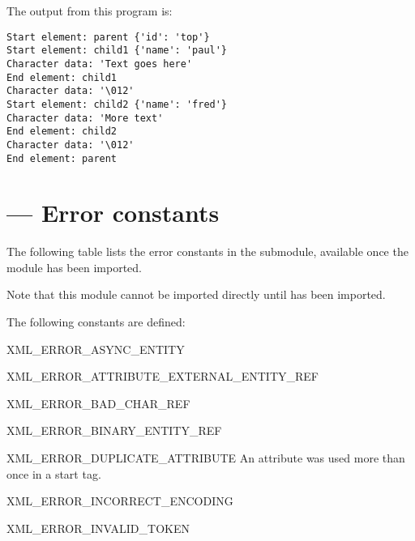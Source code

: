 The output from this program is:

\begin{verbatim}
Start element: parent {'id': 'top'}
Start element: child1 {'name': 'paul'}
Character data: 'Text goes here'
End element: child1
Character data: '\012'
Start element: child2 {'name': 'fred'}
Character data: 'More text'
End element: child2
Character data: '\012'
End element: parent
\end{verbatim}


\section{ --- Error constants}


The following table lists the error constants in the
 submodule, available once the
 module has been imported.

Note that this module cannot be imported directly until
 has been imported.

The following constants are defined:

\begin{datadesc}{XML_ERROR_ASYNC_ENTITY}
\end{datadesc}

\begin{datadesc}{XML_ERROR_ATTRIBUTE_EXTERNAL_ENTITY_REF}
\end{datadesc}

\begin{datadesc}{XML_ERROR_BAD_CHAR_REF}
\end{datadesc}

\begin{datadesc}{XML_ERROR_BINARY_ENTITY_REF}
\end{datadesc}

\begin{datadesc}{XML_ERROR_DUPLICATE_ATTRIBUTE}
An attribute was used more than once in a start tag.
\end{datadesc}

\begin{datadesc}{XML_ERROR_INCORRECT_ENCODING}
\end{datadesc}

\begin{datadesc}{XML_ERROR_INVALID_TOKEN}
\end{datadesc}

